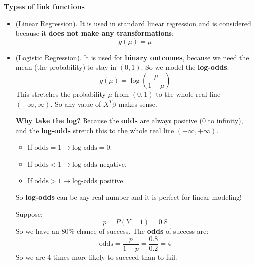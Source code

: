 \highspace
\begin{flushleft}
    \textcolor{Green3}{ \textbf{Types of link functions}}
\end{flushleft}
\begin{itemize}
    \item {} (Linear Regression). It is used in standard linear regression and is considered \naive because it \textbf{does not make any transformations}:
    \begin{equation}
        g(\mu) = \mu
    \end{equation}


    \item {} (Logistic Regression). It is used for \textbf{binary outcomes}, because we need the mean (the probability) to stay in $(0, 1)$. So we model the \textbf{log-odds}:
    \begin{equation}\label{eq: Logit Link}
        g(\mu) = \log \left( \dfrac{\mu}{1-\mu} \right)
    \end{equation}
    This stretches the probability $\mu$ from $(0,1)$ to the whole real line $(-\infty, \infty)$. So any value of $X^T \beta$ makes sense.

    \textcolor{Green3}{ \textbf{Why take the log?}} Because the \textbf{odds} are always positive (0 to infinity), and the \textbf{log-odds} stretch this to the whole real line $\left(-\infty, +\infty\right)$.
    \begin{itemize}
        \item If $\text{odds} = 1 \rightarrow \text{log-odds} = 0$.
        \item If $\text{odds} < 1 \rightarrow \text{log-odds}$ negative.
        \item If $\text{odds} > 1 \rightarrow \text{log-odds}$ positive.
    \end{itemize}
    So \textbf{log-odds} can be any real number and it is perfect for linear modeling!

    \begin{remarkbox}
        Suppose:
        \begin{equation*}
            p = P(Y = 1) = 0.8    
        \end{equation*}
        So we have an 80\% chance of success. The \textbf{odds} of success are:
        \begin{equation*}
            \text{odds} = \dfrac{p}{1 - p} = \dfrac{0.8}{0.2} = 4
        \end{equation*}
        So we are 4 times more likely to succeed than to fail.


\end{remarkbox}
\end{itemize}
